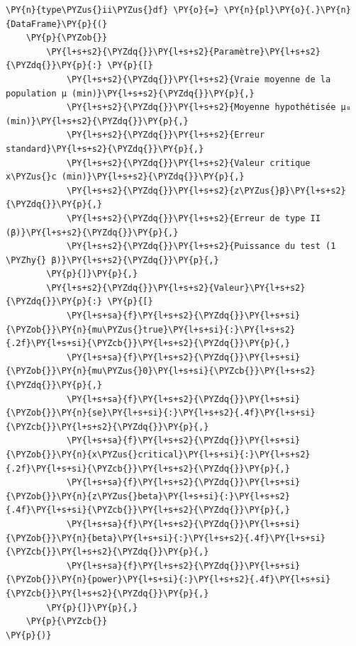 \begin{tcolorbox}[breakable, size=fbox, boxrule=1pt, pad at break*=1mm,colback=cellbackground, colframe=cellborder]
\begin{Verbatim}[commandchars=\\\{\}]
\PY{n}{type\PYZus{}ii\PYZus{}df} \PY{o}{=} \PY{n}{pl}\PY{o}{.}\PY{n}{DataFrame}\PY{p}{(}
    \PY{p}{\PYZob{}}
        \PY{l+s+s2}{\PYZdq{}}\PY{l+s+s2}{Paramètre}\PY{l+s+s2}{\PYZdq{}}\PY{p}{:} \PY{p}{[}
            \PY{l+s+s2}{\PYZdq{}}\PY{l+s+s2}{Vraie moyenne de la population μ (min)}\PY{l+s+s2}{\PYZdq{}}\PY{p}{,}
            \PY{l+s+s2}{\PYZdq{}}\PY{l+s+s2}{Moyenne hypothétisée μ₀ (min)}\PY{l+s+s2}{\PYZdq{}}\PY{p}{,}
            \PY{l+s+s2}{\PYZdq{}}\PY{l+s+s2}{Erreur standard}\PY{l+s+s2}{\PYZdq{}}\PY{p}{,}
            \PY{l+s+s2}{\PYZdq{}}\PY{l+s+s2}{Valeur critique x\PYZus{}c (min)}\PY{l+s+s2}{\PYZdq{}}\PY{p}{,}
            \PY{l+s+s2}{\PYZdq{}}\PY{l+s+s2}{z\PYZus{}β}\PY{l+s+s2}{\PYZdq{}}\PY{p}{,}
            \PY{l+s+s2}{\PYZdq{}}\PY{l+s+s2}{Erreur de type II (β)}\PY{l+s+s2}{\PYZdq{}}\PY{p}{,}
            \PY{l+s+s2}{\PYZdq{}}\PY{l+s+s2}{Puissance du test (1 \PYZhy{} β)}\PY{l+s+s2}{\PYZdq{}}\PY{p}{,}
        \PY{p}{]}\PY{p}{,}
        \PY{l+s+s2}{\PYZdq{}}\PY{l+s+s2}{Valeur}\PY{l+s+s2}{\PYZdq{}}\PY{p}{:} \PY{p}{[}
            \PY{l+s+sa}{f}\PY{l+s+s2}{\PYZdq{}}\PY{l+s+si}{\PYZob{}}\PY{n}{mu\PYZus{}true}\PY{l+s+si}{:}\PY{l+s+s2}{.2f}\PY{l+s+si}{\PYZcb{}}\PY{l+s+s2}{\PYZdq{}}\PY{p}{,}
            \PY{l+s+sa}{f}\PY{l+s+s2}{\PYZdq{}}\PY{l+s+si}{\PYZob{}}\PY{n}{mu\PYZus{}0}\PY{l+s+si}{\PYZcb{}}\PY{l+s+s2}{\PYZdq{}}\PY{p}{,}
            \PY{l+s+sa}{f}\PY{l+s+s2}{\PYZdq{}}\PY{l+s+si}{\PYZob{}}\PY{n}{se}\PY{l+s+si}{:}\PY{l+s+s2}{.4f}\PY{l+s+si}{\PYZcb{}}\PY{l+s+s2}{\PYZdq{}}\PY{p}{,}
            \PY{l+s+sa}{f}\PY{l+s+s2}{\PYZdq{}}\PY{l+s+si}{\PYZob{}}\PY{n}{x\PYZus{}critical}\PY{l+s+si}{:}\PY{l+s+s2}{.2f}\PY{l+s+si}{\PYZcb{}}\PY{l+s+s2}{\PYZdq{}}\PY{p}{,}
            \PY{l+s+sa}{f}\PY{l+s+s2}{\PYZdq{}}\PY{l+s+si}{\PYZob{}}\PY{n}{z\PYZus{}beta}\PY{l+s+si}{:}\PY{l+s+s2}{.4f}\PY{l+s+si}{\PYZcb{}}\PY{l+s+s2}{\PYZdq{}}\PY{p}{,}
            \PY{l+s+sa}{f}\PY{l+s+s2}{\PYZdq{}}\PY{l+s+si}{\PYZob{}}\PY{n}{beta}\PY{l+s+si}{:}\PY{l+s+s2}{.4f}\PY{l+s+si}{\PYZcb{}}\PY{l+s+s2}{\PYZdq{}}\PY{p}{,}
            \PY{l+s+sa}{f}\PY{l+s+s2}{\PYZdq{}}\PY{l+s+si}{\PYZob{}}\PY{n}{power}\PY{l+s+si}{:}\PY{l+s+s2}{.4f}\PY{l+s+si}{\PYZcb{}}\PY{l+s+s2}{\PYZdq{}}\PY{p}{,}
        \PY{p}{]}\PY{p}{,}
    \PY{p}{\PYZcb{}}
\PY{p}{)}
\end{Verbatim}
\end{tcolorbox}

